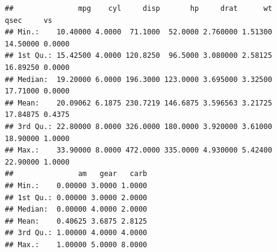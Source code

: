 \documentclass[
]{book}
\begin{document}
\begin{verbatim}
##               mpg    cyl     disp       hp     drat      wt     qsec     vs
## Min.:    10.40000 4.0000  71.1000  52.0000 2.760000 1.51300 14.50000 0.0000
## 1st Qu.: 15.42500 4.0000 120.8250  96.5000 3.080000 2.58125 16.89250 0.0000
## Median:  19.20000 6.0000 196.3000 123.0000 3.695000 3.32500 17.71000 0.0000
## Mean:    20.09062 6.1875 230.7219 146.6875 3.596563 3.21725 17.84875 0.4375
## 3rd Qu.: 22.80000 8.0000 326.0000 180.0000 3.920000 3.61000 18.90000 1.0000
## Max.:    33.90000 8.0000 472.0000 335.0000 4.930000 5.42400 22.90000 1.0000
##               am   gear   carb
## Min.:    0.00000 3.0000 1.0000
## 1st Qu.: 0.00000 3.0000 2.0000
## Median:  0.00000 4.0000 2.0000
## Mean:    0.40625 3.6875 2.8125
## 3rd Qu.: 1.00000 4.0000 4.0000
## Max.:    1.00000 5.0000 8.0000
\end{verbatim}

  
\end{document}
